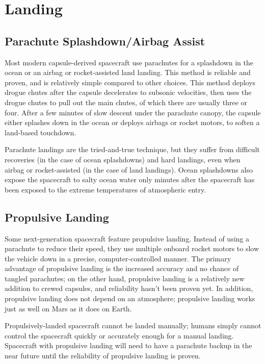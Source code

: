 \documentclass[oneside,a5paper]{book}
\begin{document}
\section{Landing}

\subsection{Parachute Splashdown/Airbag Assist}

Most modern capsule-derived spacecraft use parachutes for a splashdown
in the ocean or an airbag or rocket-assisted land landing. This method
is reliable and proven, and is relatively simple compared to other
choices. This method deploys drogue chutes after the capsule
decelerates to subsonic velocities, then uses the drogue chutes to
pull out the main chutes, of which there are usually three or
four. After a few minutes of slow descent under the parachute canopy,
the capsule either splashes down in the ocean or deploys airbags or
rocket motors, to soften a land-based touchdown.

Parachute landings are the tried-and-true technique, but they suffer
from difficult recoveries (in the case of ocean splashdowns) and hard
landings, even when airbag or rocket-assisted (in the case of land
landings). Ocean splashdowns also expose the spacecraft to salty ocean
water only minutes after the spacecraft has been exposed to the
extreme temperatures of atmospheric entry.

\subsection{Propulsive Landing}

Some next-generation spacecraft feature propulsive landing. Instead of
using a parachute to reduce their speed, they use multiple onboard
rocket motors to slow the vehicle down in a precise,
computer-controlled manner. The primary advantage of propulsive
landing is the increased accuracy and no chance of tangled parachutes;
on the other hand, propulsive landing is a relatively new addition to
crewed capsules, and reliability hasn’t been proven yet. In addition,
propulsive landing does not depend on an atmosphere; propulsive
landing works just as well on Mars as it does on Earth.

Propulsively-landed spacecraft cannot be landed manually; humans
simply cannot control the spacecraft quickly or accurately enough for
a manual landing. Spacecraft with propulsive landing will need to have
a parachute backup in the near future until the reliability of
propulsive landing is proven.
\end{document}
